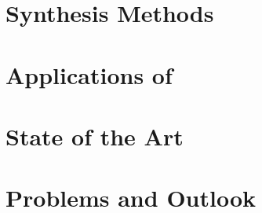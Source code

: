 \documentclass[%
 reprint,
 amsmath,amssymb,
 aps,
pra,
]{revtex4-1}
\begin{document}
%

\section{\label{sec:synthesis_methods} Synthesis Methods}

\section{\label{sec:mos2_applications} Applications of }

\section{\label{sec:state_of_the_art} State of the Art}

\section{\label{sec:problems_and_outlook} Problems and Outlook}




\end{document}
